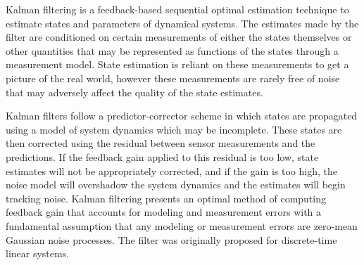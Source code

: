 Kalman filtering is a feedback-based sequential optimal estimation technique \cite{kalman1960new} to estimate states and parameters of dynamical systems. The estimates made by the filter are conditioned on certain measurements of either the states themselves or other quantities that may be represented as functions of the states through a measurement model. State estimation is reliant on these measurements to get a picture of the real world, however these measurements are rarely free of noise that may adversely affect the quality of the state estimates. 

Kalman filters follow a predictor-corrector scheme in which states are propagated using a model of system dynamics which may be incomplete. These states are then corrected using the residual between sensor measurements and the predictions. If the feedback gain applied to this residual is too low, state estimates will not be appropriately corrected, and if the gain is too high, the noise model will overshadow the system dynamics and the estimates will begin tracking noise. Kalman filtering presents an optimal method of computing feedback gain that accounts for modeling and measurement errors with a fundamental assumption that any modeling or measurement errors are zero-mean Gaussian noise processes. The filter was originally proposed for discrete-time linear systems. 
 

